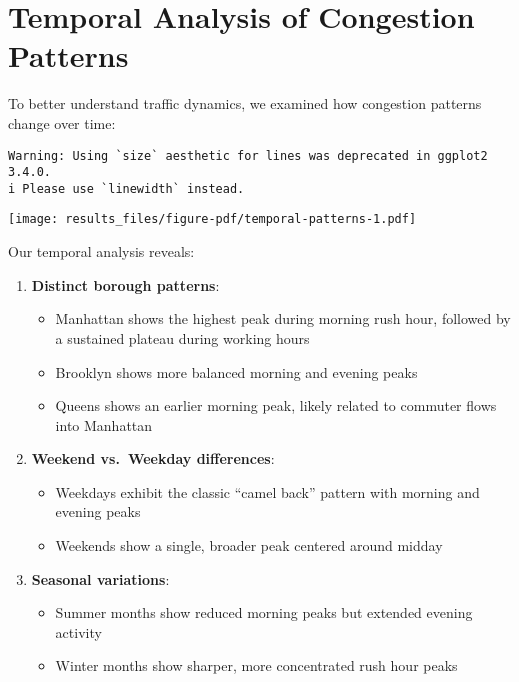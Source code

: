 \documentclass[
  letterpaper,
  DIV=11,
  numbers=noendperiod]{scrreprt}
\providecommand{\tightlist}{%
  \setlength{\itemsep}{0pt}\setlength{\parskip}{0pt}}\usepackage{longtable,booktabs,array}
\begin{document}
\section{Temporal Analysis of Congestion
Patterns}\label{temporal-analysis-of-congestion-patterns}

To better understand traffic dynamics, we examined how congestion
patterns change over time:

\begin{verbatim}
Warning: Using `size` aesthetic for lines was deprecated in ggplot2 3.4.0.
i Please use `linewidth` instead.
\end{verbatim}

\texttt{[image: results\_files/figure-pdf/temporal-patterns-1.pdf]}

Our temporal analysis reveals:

\begin{enumerate}
\def\labelenumi{\arabic{enumi}.}
\tightlist
\item
  \textbf{Distinct borough patterns}:

  \begin{itemize}
  \tightlist
  \item
    Manhattan shows the highest peak during morning rush hour, followed
    by a sustained plateau during working hours
  \item
    Brooklyn shows more balanced morning and evening peaks
  \item
    Queens shows an earlier morning peak, likely related to commuter
    flows into Manhattan
  \end{itemize}
\item
  \textbf{Weekend vs.~Weekday differences}:

  \begin{itemize}
  \tightlist
  \item
    Weekdays exhibit the classic ``camel back'' pattern with morning and
    evening peaks
  \item
    Weekends show a single, broader peak centered around midday
  \end{itemize}
\item
  \textbf{Seasonal variations}:

  \begin{itemize}
  \tightlist
  \item
    Summer months show reduced morning peaks but extended evening
    activity
  \item
    Winter months show sharper, more concentrated rush hour peaks
  \end{itemize}
\end{enumerate}
\end{document}
